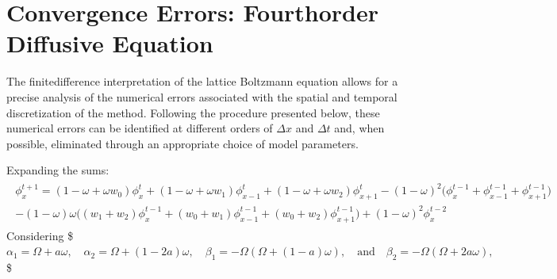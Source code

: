 \documentclass[letterpaper,10pt,english,openany,oneside]{jupyterBook}
\begin{document}
\section{Convergence Errors: Fourth\sphinxhyphen{}order Diffusive Equation}
\label{\detokenize{Refs/LBM-Study/FDM-Belloti/FDM-LBM-Diffusive:convergence-errors-fourth-order-diffusive-equation}}\label{\detokenize{Refs/LBM-Study/FDM-Belloti/FDM-LBM-Diffusive:convergence-errors-mrt-diffusive-fourth-order}}
\sphinxAtStartPar
The finite\sphinxhyphen{}difference interpretation of the lattice Boltzmann equation allows for a precise analysis of the numerical errors associated with the spatial and temporal discretization of the method. Following the procedure presented below, these numerical errors can be identified at different orders of \(\Delta x\) and \(\Delta t\) and, when possible, eliminated through an appropriate choice of model parameters.

\sphinxAtStartPar
Expanding the sums:
\begin{equation*}
\begin{split}
\begin{array}{c}
\phi_{x}^{t+1} = (1-\omega + \omega w_{0}) \phi_{x}^{t} + (1-\omega + \omega w_{1}) \phi_{x-1}^{t} + (1-\omega + \omega w_{2}) \phi_{x+1}^{t} - (1-\omega)^{2} \Big( \phi_{x}^{t-1} + \phi_{x-1}^{t-1} + \phi_{x+1}^{t-1}  \Big) \\
-(1-\omega)\omega \Big( (w_{1}+w_{2})\phi_{x}^{t-1} + (w_{0}+w_{1})\phi_{x-1}^{t-1} + (w_{0}+w_{2})\phi_{x+1}^{t-1}  \Big) + (1-\omega)^{2} \phi_{x}^{t-2}
\end{array}
\end{split}
\end{equation*}
\sphinxAtStartPar
Considering
\$\(
\alpha_{1}=\Omega + a\omega, \quad \alpha_{2}=\Omega + (1-2a)\omega, \quad \beta_{1}=-\Omega(\Omega + (1-a)\omega), \quad \textrm{and} \quad \beta_{2}=-\Omega(\Omega + 2a\omega),
\)\$
\end{document}
